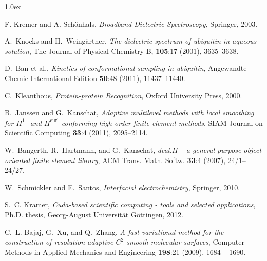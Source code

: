 \documentclass[runningheads]{lncse}
\begin{document}
\ifx\undefined\bysame
\newcommand{\bysame}{\leavevmode\hbox to3em{\hrulefill}\,}
\fi
\begin{thebibliography}{99}
\parskip1.0ex


  {\sc F. Kremer and A. Sch{\"o}nhals},
{\em Broadband Dielectric Spectroscopy}, Springer, %
2003.




{\sc A.~Knocks and H.~Weing{\"a}rtner}, 
{\em The dielectric spectrum of ubiquitin in aqueous solution},
 The Journal of Physical Chemistry B, {\bf 105}:17 (2001), 3635--3638.

{\sc D.~Ban et al.}, {\em Kinetics of
  conformational sampling in ubiquitin}, Angewandte Chemie International
  Edition {\bf 50}:48 (2011), 11437--11440.
  
  {\sc C.~Kleanthous},  {\em Protein-protein Recognition}, %
  Oxford University Press, 2000.
  
 

{\sc B.~Janssen and G.~Kanschat}, {\em Adaptive multilevel methods with local
  smoothing for $H^1$- and $H^{\mathrm{curl}}$-conforming high order finite
  element methods}, SIAM Journal on Scientific Computing {\bf 33}:4 (2011),
  2095--2114.
  
  {\sc W.~Bangerth, R.~Hartmann, and G.~Kanschat}, {\em {deal.II} -- a general
    purpose object oriented finite element library}, ACM Trans. Math. Softw. {\bf
    33}:4 (2007), 24/1--24/27.

{\sc W.~Schmickler and E.~Santos}, {\em Interfacial electrochemistry},
  Springer, 2010.
  
  {\sc S.~C. Kramer}, {\em Cuda-based scientific computing - tools and selected
    applications}, Ph.D. thesis, 
    Georg-August Universit{\"a}t G{\"o}ttingen, 2012.
  
   
  {\sc C.~L. Bajaj, G.~Xu, and Q.~Zhang}, {\em A fast variational method for the
    construction of resolution adaptive {$C^2$}-smooth molecular surfaces},
    Computer Methods in Applied Mechanics and Engineering {\bf
    198}:21 (2009), 1684 -- 1690.
  


\end{thebibliography}
\end{document}
